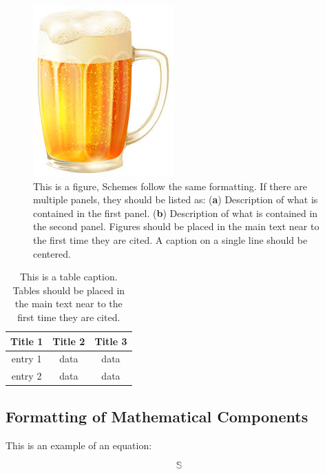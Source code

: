\documentclass[bioengineering,article,submit,moreauthors,pdftex,10pt,a4paper]{mdpi}
\begin{document}
 \begin{figure}[H]
 	\caption{\label{beer}This is a figure, Schemes follow the same formatting. If there are multiple panels, they should be listed as: (\textbf{a}) Description of what is contained in the first panel. (\textbf{b}) Description of what is contained in the second panel. Figures should be placed in the main text near to the first time they are cited. A caption on a single line should be centered.}
 	\begin{center}
 		\includegraphics[scale=0.40]{imagens/beer.jpg} 		
 	\end{center}
 \end{figure}  



\begin{table}[H]
\caption{This is a table caption. Tables should be placed in the main text near to the first time they are cited.}
\centering
\begin{tabular}{ccc}
\toprule
\textbf{Title 1}	& \textbf{Title 2}	& \textbf{Title 3}\\
\midrule
entry 1		& data			& data\\
entry 2		& data			& data\\
\bottomrule
\end{tabular}
\end{table}

\subsection{Formatting of Mathematical Components}

This is an example of an equation:

\begin{equation}
\mathbb{S}
\end{equation}
\end{document}
